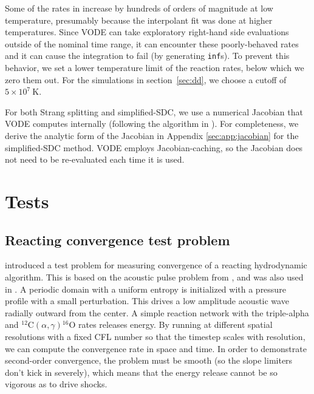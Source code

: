 \documentclass[linenumbers,trackchanges]{aastex631}
\newcommand{\isotm}[2]{{}^{#2}\mathrm{#1}}
\begin{document}
Some of the rates in \citet{reaclib} increase by hundreds of orders of
magnitude at low temperature, presumably because the interpolant fit was done at
higher temperatures.  Since VODE can take exploratory right-hand side evaluations
outside of the nominal time range, it can encounter these poorly-behaved rates
and it can cause the integration to fail (by generating {\tt inf}s).  To prevent
this behavior, we set a lower temperature limit of the reaction rates, below
which we zero them out.  For the simulations in section~\ref{sec:dd}, we choose a cutoff of
$5\times 10^7~\mathrm{K}$.


For both Strang splitting and simplified-SDC, we use a numerical Jacobian that VODE
computes internally (following the algorithm in \citealt{lsode}).  For
completeness, we derive the analytic form of the Jacobian in Appendix
\ref{sec:app:jacobian} for the simplified-SDC method. VODE employs
Jacobian-caching, so the Jacobian does not need to be re-evaluated each time it
is used.


\section{Tests}

\subsection{Reacting convergence test problem}

\citet{castro_sdc} introduced a test problem for measuring convergence
of a reacting hydrodynamic algorithm.  This is based on the acoustic
pulse problem from \citet{mccorquodalecolella}, and was also used in
\citet{strang_rnaas}.  A periodic domain with a uniform entropy is
initialized with a pressure profile with a small perturbation.  This
drives a low amplitude acoustic wave radially outward from the center.
A simple reaction network with the triple-alpha and
$\isotm{C}{12}(\alpha,\gamma)\isotm{O}{16}$ rates releases energy.  By
running at different spatial resolutions with a fixed CFL number so that the timestep scales
with resolution, we can compute the convergence rate in space and time.
In order to demonstrate second-order convergence, the problem must be smooth (so
the slope limiters don't kick in severely), which means that the
energy release cannot be so vigorous as to drive shocks.

\end{document}

